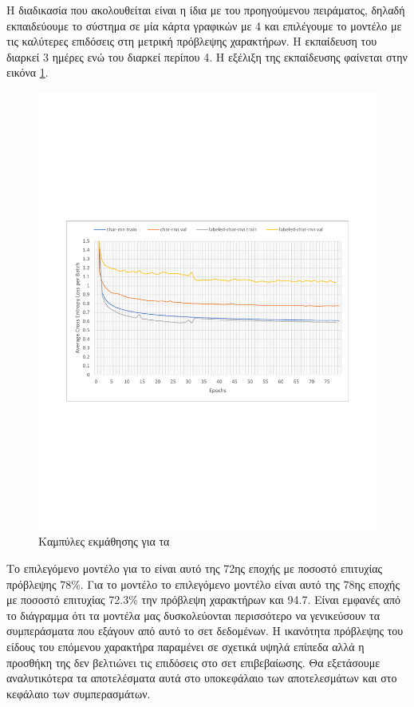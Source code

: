 Η διαδικασία που ακολουθείται είναι η ίδια με του προηγούμενου πειράματος, δηλαδή εκπαιδεύουμε το σύστημα σε μία κάρτα γραφικών  με 4  και επιλέγουμε το μοντέλο με τις καλύτερες επιδόσεις στη μετρική πρόβλεψης χαρακτήρων.
Η εκπαίδευση του  διαρκεί 3 ημέρες ενώ του  διαρκεί περίπου 4. Η εξέλιξη της εκπαίδευσης φαίνεται στην εικόνα \ref{training2}.

\begin{figure}[h]
	\caption{Καμπύλες εκμάθησης για τα }
	\label{training2}
	\includegraphics[width=\textwidth, trim = 25 220 25 220, clip, keepaspectratio]{images/training2.pdf}
	\centering
\end{figure}


Το επιλεγόμενο μοντέλο για το  είναι αυτό της 72ης εποχής με ποσοστό επιτυχίας πρόβλεψης 78\%. Για το μοντέλο  το επιλεγόμενο μοντέλο είναι αυτό της 78ης εποχής με ποσοστό επιτυχίας 72.3\% την πρόβλεψη χαρακτήρων και 94.7. Είναι εμφανές από το διάγραμμα ότι τα μοντέλα μας δυσκολεύονται περισσότερο να γενικεύσουν τα συμπεράσματα που εξάγουν από αυτό το σετ δεδομένων. Η ικανότητα πρόβλεψης του είδους του επόμενου χαρακτήρα παραμένει σε σχετικά υψηλά επίπεδα αλλά η προσθήκη της δεν βελτιώνει τις επιδόσεις στο σετ επιβεβαίωσης. Θα εξετάσουμε αναλυτικότερα τα αποτελέσματα αυτά στο υποκεφάλαιο των αποτελεσμάτων και στο κεφάλαιο των συμπερασμάτων.

